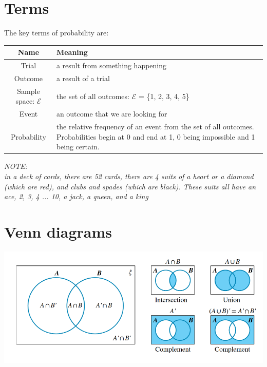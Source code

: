 \documentclass{book}
\newenvironment{note}{\begin{center}\em NOTE:\\}{\end{center}}
\begin{document}
\section{Terms}
The key terms of probability are:
\begin{center}
	\begin{tabular}{c|p{8cm}}
		Name                        & Meaning                                                                                                                                          \\ \hline
		Trial                       & a result from something happening                                                                                                                \\
		Outcome                     & a result of a trial                                                                                                                              \\
		Sample space: $\mathcal{E}$ & the set of all outcomes: $\mathcal{E}$ = \{1, 2, 3, 4, 5\}                                                                                       \\
		Event                       & an outcome that we are looking for                                                                                                               \\
		Probability                 & the relative frequency of an event from the set of all outcomes.  Probabilities begin at 0 and end at 1, 0 being impossible and 1 being certain.
	\end{tabular}
\end{center}
\begin{note}
	in a deck of cards, there are 52 cards, there are 4 suits of a heart or a diamond (which are red), and clubs and spades (which are black).  These suits all have an ace, 2, 3, 4 ... 10, a jack, a queen, and a king
\end{note}

\section{Venn diagrams}
\begin{center}
	\includegraphics[scale=0.5]{venn diagrams}
\end{center}
\end{document}

